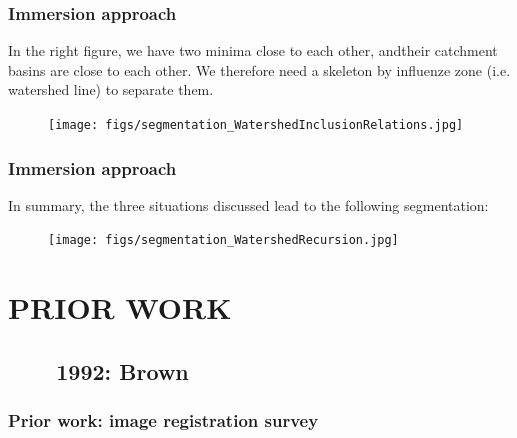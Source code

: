 \begin{frame}
\frametitle{Immersion approach}
\logoCSIPCPL\mypagenum
	In the right figure, we have two minima close to each other, andtheir catchment basins are close to each other.  We therefore need a skeleton by influenze zone (i.e. watershed line) to separate them.
	\begin{figure}[!htp]
		\texttt{[image: figs/segmentation\_WatershedInclusionRelations.jpg]}
	\end{figure}
\end{frame}





\begin{frame}
\frametitle{Immersion approach}
\logoCSIPCPL\mypagenum
	In summary, the three situations discussed lead to the following
	segmentation:
	\begin{figure}[!htp]
		\texttt{[image: figs/segmentation\_WatershedRecursion.jpg]}
	\end{figure}
\end{frame}

\section{PRIOR WORK}

\subsection{\ \ \ \ 1992: Brown}
\begin{frame}
\frametitle{Prior work: image registration survey}
\framesubtitle{}
\mypagenum
{}
\end{frame}






